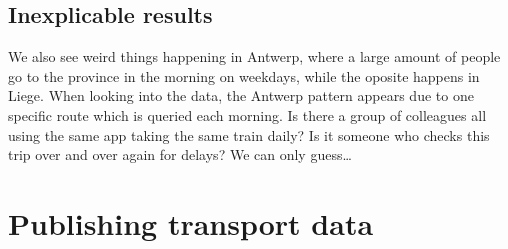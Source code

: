 \documentclass{sig-alternate}
\begin{document}
\subsection{Inexplicable results}

We also see weird things happening in Antwerp, where a large amount of people go to the province in the morning on weekdays, while the oposite happens in Liege.
When looking into the data, the Antwerp pattern appears due to one specific route which is queried each morning.
Is there a group of colleagues all using the same app taking the same train daily?
Is it someone who checks this trip over and over again for delays?
We can only guess\ldots

\section{Publishing transport data}
\label{sec:publishing}



\end{document}
